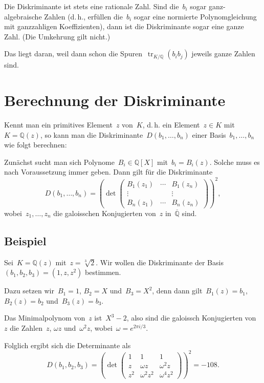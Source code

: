 \documentclass[12pt,a4paper,ngerman]{scrartcl}
\newcommand{\Q}{\mathbb{Q}}
\newcommand{\QQ}{\overline{\mathbb{Q}}}
\theoremstyle{definition}
\theoremstyle{plain}
\theoremstyle{remark}
\newcommand{\tr}[1]{\operatorname{tr}_{K/\Q}(#1)}
\begin{document}
Die Diskriminante ist stets eine rationale Zahl. Sind die~$b_i$ sogar
ganz-algebraische Zahlen (d.\,h., erfüllen die~$b_i$ sogar eine normierte
Polynomgleichung mit ganzzahligen Koeffizienten), dann ist die
Diskriminante sogar eine ganze Zahl. (Die Umkehrung gilt nicht.)

Das liegt daran, weil dann schon die Spuren~$\tr{b_ib_j}$ jeweils ganze Zahlen
sind.


\section*{Berechnung der Diskriminante}

Kennt man ein primitives Element~$z$ von~$K$, d.\,h. ein Element~$z \in K$
mit~$K = \Q(z)$, so kann man die Diskriminante~$D(b_1,\ldots,b_n)$ einer
Basis~$b_1,\ldots,b_n$ wie folgt berechnen:

Zunächst sucht man sich Polynome~$B_i \in \Q[X]$ mit~$b_i = B_i(z)$. Solche
muss es nach Voraussetzung immer geben. Dann gilt für die Diskriminante
\[ D(b_1,\ldots,b_n) = \left(\operatorname{det} \begin{pmatrix}
  B_1(z_1) & \cdots & B_1(z_n) \\
  \vdots && \vdots \\
  B_n(z_1) & \cdots & B_n(z_n)
\end{pmatrix}\right)^2, \]
wobei~$z_1,\ldots,z_n$ die galoisschen Konjugierten von~$z$ in~$\QQ$ sind.


\subsection*{Beispiel}

Sei~$K = \Q(z)$ mit~$z = \sqrt[3]{2}$. Wir wollen die Diskriminante der
Basis~$(b_1,b_2,b_3) = (1, z, z^2)$ bestimmen.

Dazu setzen wir~$B_1 = 1$, $B_2 = X$ und~$B_3 = X^2$, denn dann gilt~$B_1(z) =
b_1$, $B_2(z) = b_2$ und~$B_3(z) = b_3$.

Das Minimalpolynom von~$z$ ist~$X^3-2$, also sind die galoissch Konjugierten
von~$z$ die Zahlen~$z$, $\omega z$ und~$\omega^2 z$, wobei~$\omega = e^{2\pi
i/3}$.

Folglich ergibt sich die Determinante als
\[ D(b_1,b_2,b_3) = \left(\operatorname{det} \begin{pmatrix}
  1 & 1 & 1 \\
  z & \omega z & \omega^2 z \\
  z^2 & \omega^2 z^2 & \omega^4 z^2
\end{pmatrix}\right)^2 = -108. \]
\end{document}
